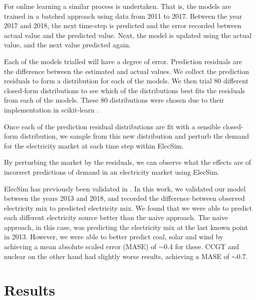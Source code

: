 \documentclass[final,3p,times,twocolumn,numbers]{elsarticle}
\begin{document}
For online learning a similar process is undertaken. That is, the models are trained in a batched approach using data from 2011 to 2017. Between the year 2017 and 2018, the next time-step is predicted and the error recorded between actual value and the predicted value. Next, the model is updated using the actual value, and the next value predicted again.



Each of the models trialled will have a degree of error. Prediction residuals are the difference between the estimated and actual values. We collect the prediction residuals to form a distribution for each of the models. We then trial 80 different closed-form distributions to see which of the distributions best fits the residuals from each of the models. These 80 distributions were chosen due to their implementation in scikit-learn \cite{scikit-learn}.

Once each of the prediction residual distributions are fit with a sensible closed-form distribution, we sample from this new distribution and perturb the demand for the electricity market at each time step within ElecSim.

By perturbing the market by the residuals, we can observe what the effects are of incorrect predictions of demand in an electricity market using ElecSim. %

ElecSim has previously been validated in \cite{Kell2020}. In this work, we validated our model between the years 2013 and 2018, and recorded the difference between observed electricity mix to predicted electricity mix. We found that we were able to predict each different electricity source better than the naive approach. The naive approach, in this case, was predicting the electricity mix at the last known point in 2013. However, we were able to better predict coal, solar and wind by achieving a mean absolute scaled error (MASE) of ${\sim}$0.4 for these. CCGT and nuclear on the other hand had slightly worse results, achieving a MASE of ${\sim}$0.7.



\section{Results}
\label{sec:results}
\end{document}
